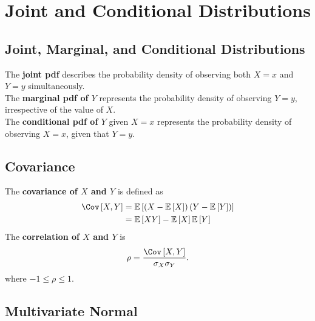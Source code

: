\newpage

\section{Joint and Conditional Distributions}

\subsection{Joint, Marginal, and Conditional Distributions}

\begin{definition}
The \textbf{joint pdf} describes the probability density of observing both $X=x$ and $Y=y$ simultaneously. \\

The \textbf{marginal pdf of $Y$} represents the probability density of observing $Y=y$, irrespective of the value of $X$. \\

The \textbf{conditional pdf of $Y$} given $X=x$ represents the probability density of observing $X=x$, given that $Y=y$.
\end{definition}

\subsection{Covariance}

\begin{definition}
The \textbf{covariance of $X$ and $Y$} is defined as
\begin{align*}
    \Cov \left[X, Y \right] &= \mathbb{E}\left[ \left(X - \mathbb{E}\left[X \right]\right) \left(Y - \mathbb{E}\left[Y \right]\right)  \right] \\
    &= \mathbb{E}\left[XY \right] - \mathbb{E}\left[X \right] \mathbb{E}\left[Y \right] 
\end{align*}
The \textbf{correlation of $X$ and $Y$} is
\[
    \rho = \frac{\Cov \left[X, Y \right] }{\sigma_X \sigma_Y}.
\]
where $-1 \leq \rho \leq 1$.
\end{definition}



\subsection{Multivariate Normal}

